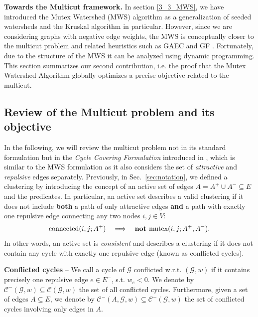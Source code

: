 \noindent \textbf{Towards the Multicut framework.}
In section \ref{3_3_MWS}, we have introduced the Mutex Watershed (MWS) algorithm as a generalization of seeded watersheds and the Kruskal algorithm in particular. 
However, since we are considering graphs with negative edge weights, the MWS is conceptually closer to the multicut problem and related heuristics such as GAEC and GF \cite{levinkov2017comparative}.
Fortunately, due to the structure of the MWS it can be analyzed using dynamic programming. This section summarizes our second contribution, i.e. the proof that the Mutex Watershed Algorithm globally optimizes a precise objective related to the multicut.

\subsection{Review of the Multicut problem and its objective}\label{sec:multicut_and_its_objective}
In the following, we will review the multicut problem not in its standard formulation but in the \textit{Cycle Covering Formulation} introduced in \cite{lange2018partial}, which is similar to the MWS formulation as it also considers the set of \textit{attractive} and \textit{repulsive} edges separately. 
Previously, in Sec.~\ref{sec:notation}, we defined a clustering by introducing the concept of an active set of edges \mbox{$A=A^+\cup A^-\subseteq E$} and the  predicates. In particular, an active set describes a valid clustering if it does not include \textbf{both} a path of only attractive edges \textbf{and} a path with exactly one repulsive edge connecting any two nodes $i,j\in V$:
\begin{equation}
\textrm{connected}(i, j; A^+) \quad \Longrightarrow \quad \textbf{not } \textrm{mutex}(i, j; A^+,A^-).
\end{equation}
In other words, an active set is \emph{consistent} and describes a clustering if it does not contain any cycle with exactly one repulsive edge (known as conflicted cycles). 

\begin{definition} \label{def:conflicted_cycles}
\textbf{Conflicted cycles} --
We call a cycle of $\mathcal{G}$ conflicted w.r.t. $(\mathcal{G},w)$ if it contains precisely one repulsive edge $e \in E^-$, s.t. $w_e < 0$. We denote by $\mathcal{C}^-(\mathcal{G},w) \subseteq \mathcal{C}(\mathcal{G},w)$ the set of all conflicted cycles. Furthermore, given a set of edges $A \subseteq E$, we denote by $\mathcal{C}^-(A, \mathcal{G},w) \subseteq \mathcal{C}^-(\mathcal{G},w)$ the set of conflicted cycles involving only edges in $A$.
\end{definition}

